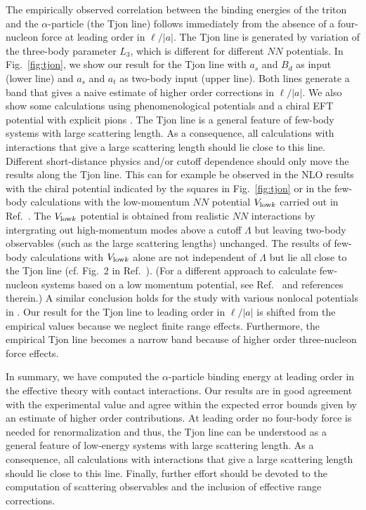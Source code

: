 \documentclass[prc,preprint,tightenlines,showpacs]{revtex4}
\begin{document}
The empirically observed correlation between the binding energies of the 
triton and the $\alpha$-particle (the Tjon line) follows 
immediately from the absence of a four-nucleon force at leading
order in $\ell/|a|$. The Tjon line is generated 
by variation of the three-body parameter $L_3$, which 
is different for different $NN$ potentials.
In Fig.~\ref{fig:tjon}, we show our result for the Tjon line with $a_s$
and $B_d$ as input (lower line)
and $a_s$ and $a_t$ as two-body input (upper line). Both lines generate
a band that gives a naive estimate of higher order corrections
in $\ell/|a|$. We also show some calculations using phenomenological 
potentials \cite{Nogga:2000uu} and a chiral EFT potential with explicit
pions \cite{Epelbaum:2002vt,Epelbaum:2000mx}.
The Tjon line is a general feature of few-body systems 
with large scattering length. As a consequence, all calculations with 
interactions that give a
large scattering length should lie close to this line. Different
short-distance physics and/or cutoff dependence should only move 
the results along the Tjon line. This can for example be observed in
the NLO results with the chiral potential indicated by the squares
in Fig.~\ref{fig:tjon} or in
the few-body calculations with the low-momentum $NN$ potential 
$V_{{\rm low} k}$ carried out in Ref.~\cite{Nogga:2004ab}. The 
$V_{{\rm low} k}$ potential
is obtained from realistic $NN$ interactions by intergrating out 
high-momentum modes above a cutoff $\Lambda$
but leaving two-body observables (such as the large
scattering lengths) unchanged. The results of few-body calculations 
with $V_{{\rm low} k}$ alone are not independent of $\Lambda$ but lie all
close to the Tjon line (cf. Fig.~2 in Ref.~\cite{Nogga:2004ab}). (For
a different approach to calculate few-nucleon systems based on a low
momentum potential, see Ref.~\cite{Fujii:2004dd} and references therein.)
A similar conclusion holds for the study with various nonlocal potentials
in \cite{Lazauskas:2004hq}.
Our result for the Tjon line to leading order in $\ell/|a|$ is 
shifted from the empirical values because we neglect finite range effects.
Furthermore, the empirical Tjon line becomes a narrow band because of higher 
order three-nucleon force effects.


In summary, we have computed the $\alpha$-particle binding energy at leading
order in the effective theory with contact interactions.
Our results are in good agreement with the experimental value
and agree within the expected error bounds given by an estimate
of higher order contributions.
At leading order no four-body force is needed for renormalization
and thus, the Tjon line can be understood as a general feature of
low-energy systems with large scattering length. 
As a consequence, all calculations with interactions that give a
large scattering length should lie close to this line. 
Finally, further effort should be devoted to the computation of scattering
observables and the inclusion of effective range corrections.
\end{document}
